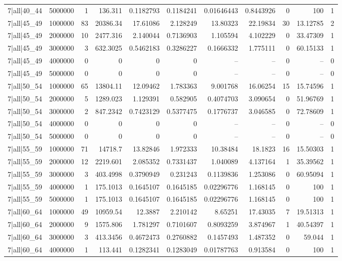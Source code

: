 \begin{tabular}{lrrrrrrrrrr}
7|all|40\_44 & 5000000 & 1 & 136.311 & 0.1182793 & 0.1184241 & 0.01646443 & 0.8443926 & 0 & 100 & 1 \\
7|all|45\_49 & 1000000 & 83 & 20386.34 & 17.61086 & 2.128249 & 13.80323 & 22.19834 & 30 & 13.12785 & 2 \\
7|all|45\_49 & 2000000 & 10 & 2477.316 & 2.140044 & 0.7136903 & 1.105594 & 4.102229 & 0 & 33.47309 & 1 \\
7|all|45\_49 & 3000000 & 3 & 632.3025 & 0.5462183 & 0.3286227 & 0.1666332 & 1.775111 & 0 & 60.15133 & 1 \\
7|all|45\_49 & 4000000 & 0 & 0 & 0 & 0 & -- & -- & 0 & -- & 0 \\
7|all|45\_49 & 5000000 & 0 & 0 & 0 & 0 & -- & -- & 0 & -- & 0 \\
7|all|50\_54 & 1000000 & 65 & 13804.11 & 12.09462 & 1.783363 & 9.001768 & 16.06254 & 15 & 15.74596 & 1 \\
7|all|50\_54 & 2000000 & 5 & 1289.023 & 1.129391 & 0.582905 & 0.4074703 & 3.090654 & 0 & 51.96769 & 1 \\
7|all|50\_54 & 3000000 & 2 & 847.2342 & 0.7423129 & 0.5377475 & 0.1776737 & 3.046585 & 0 & 72.78609 & 1 \\
7|all|50\_54 & 4000000 & 0 & 0 & 0 & 0 & -- & -- & 0 & -- & 0 \\
7|all|50\_54 & 5000000 & 0 & 0 & 0 & 0 & -- & -- & 0 & -- & 0 \\
7|all|55\_59 & 1000000 & 71 & 14718.7 & 13.82846 & 1.972333 & 10.38484 & 18.1823 & 16 & 15.50303 & 1 \\
7|all|55\_59 & 2000000 & 12 & 2219.601 & 2.085352 & 0.7331437 & 1.040089 & 4.137164 & 1 & 35.39562 & 1 \\
7|all|55\_59 & 3000000 & 3 & 403.4998 & 0.3790949 & 0.231243 & 0.1139836 & 1.253086 & 0 & 60.95094 & 1 \\
7|all|55\_59 & 4000000 & 1 & 175.1013 & 0.1645107 & 0.1645185 & 0.02296776 & 1.168145 & 0 & 100 & 1 \\
7|all|55\_59 & 5000000 & 1 & 175.1013 & 0.1645107 & 0.1645185 & 0.02296776 & 1.168145 & 0 & 100 & 1 \\
7|all|60\_64 & 1000000 & 49 & 10959.54 & 12.3887 & 2.210142 & 8.65251 & 17.43035 & 7 & 19.51313 & 1 \\
7|all|60\_64 & 2000000 & 9 & 1575.806 & 1.781297 & 0.7101607 & 0.8093259 & 3.874967 & 1 & 40.54397 & 1 \\
7|all|60\_64 & 3000000 & 3 & 413.3456 & 0.4672473 & 0.2760882 & 0.1457493 & 1.487352 & 0 & 59.044 & 1 \\
7|all|60\_64 & 4000000 & 1 & 113.441 & 0.1282341 & 0.1283049 & 0.01787763 & 0.913584 & 0 & 100 & 1 \\

\end{tabular}
